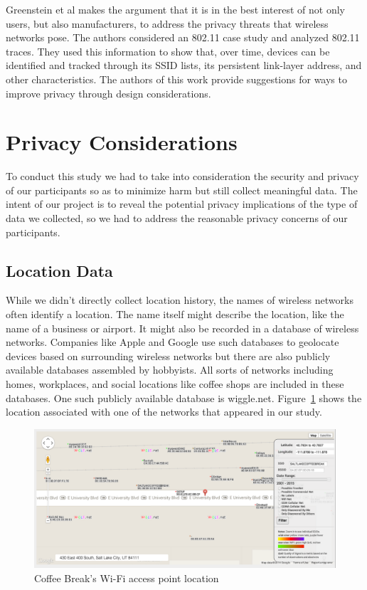 \documentclass[letterpaper,twocolumn,10pt]{article}
\begin{document}
Greenstein et al \cite{greenstein} makes the argument that it is in the best interest of not only users, but also manufacturers, to address the privacy threats that wireless networks pose. The authors considered an 802.11 case study and analyzed 802.11 traces. They used this information to show that, over time, devices can be identified and tracked through its SSID lists, its persistent link-layer address, and other characteristics. The authors of this work provide suggestions for ways to improve privacy through design considerations.

\section{Privacy Considerations}
To conduct this study we had to take into consideration the security and privacy of our participants so as to minimize harm but still collect meaningful data. The intent of our project is to reveal the potential privacy implications of the type of data we collected, so we had to address the reasonable privacy concerns of our participants.

\subsection{Location Data}
While we didn't directly collect location history, the names of wireless networks often identify a location. The name itself might describe the location, like the name of a business or airport. It might also be recorded in a database of wireless networks. Companies like Apple and Google use such databases to geolocate devices based on surrounding wireless networks but there are also publicly available databases assembled by hobbyists. All sorts of networks including homes, workplaces, and social locations like coffee shops are included in these databases. One such publicly available database is wiggle.net. Figure~\ref{wiggle} shows the location associated with one of the networks that appeared in our study.

\begin{figure}
\centering
\includegraphics[scale=.43]{wigle}
\caption{\textsf{Coffee Break's Wi-Fi access point location}}
\label{wiggle}
\end{figure}
\end{document}
